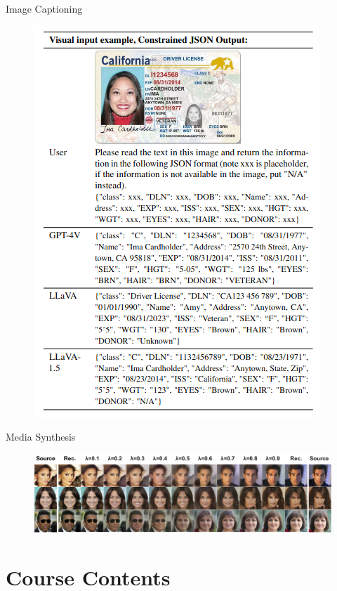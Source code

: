 \documentclass{beamer}
\begin{document}
    \begin{frame}{Image Captioning \cite{liu2023visual}}
      \begin{figure}
        \includegraphics[scale=0.4]{./figures/visual_chat.png}
      \end{figure}
    \end{frame}

    \begin{frame}{Media Synthesis \cite{ho2020denoising}}
      \begin{figure}
        \includegraphics[width=\linewidth]{./figures/interp.jpg}
      \end{figure}
    \end{frame}


    \section{Course Contents}
\end{document}
